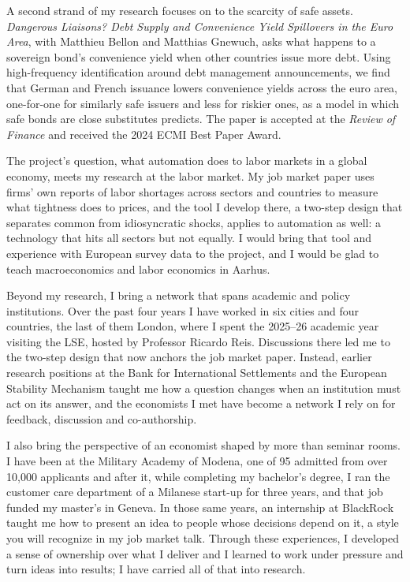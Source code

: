 \documentclass[11pt]{article}
\begin{document}
A second strand of my research focuses on to the scarcity of safe assets. \textit{Dangerous Liaisons? Debt Supply and Convenience Yield Spillovers in the Euro Area}, with Matthieu Bellon and Matthias Gnewuch, asks what happens to a sovereign bond's convenience yield when other countries issue more debt. Using high-frequency identification around debt management announcements, we find that German and French issuance lowers convenience yields across the euro area, one-for-one for similarly safe issuers and less for riskier ones, as a model in which safe bonds are close substitutes predicts. The paper is accepted at the \textit{Review of Finance} and received the 2024 ECMI Best Paper Award.

The project's question, what automation does to labor markets in a global economy, meets my research at the labor market. My job market paper uses firms' own reports of labor shortages across sectors and countries to measure what tightness does to prices, and the tool I develop there, a two-step design that separates common from idiosyncratic shocks, applies to automation as well: a technology that hits all sectors but not equally. I would bring that tool and experience with European survey data to the project, and I would be glad to teach macroeconomics and labor economics in Aarhus.

Beyond my research, I bring a network that spans academic and policy institutions. Over the past four years I have worked in six cities and four countries, the last of them London, where I spent the 2025--26 academic year visiting the LSE, hosted by Professor Ricardo Reis. Discussions there led me to the two-step design that now anchors the job market paper. Instead, earlier research positions at the Bank for International Settlements and the European Stability Mechanism taught me how a question changes when an institution must act on its answer, and the economists I met have become a network I rely on for feedback, discussion and co-authorship.

I also bring the perspective of an economist shaped by more than seminar rooms. I have been at the Military Academy of Modena, one of 95 admitted from over 10,000 applicants and after it, while completing my bachelor's degree, I ran the customer care department of a Milanese start-up for three years, and that job funded my master's in Geneva. In those same years, an internship at BlackRock taught me how to present an idea to people whose decisions depend on it, a style you will recognize in my job market talk. Through these experiences, I developed a sense of ownership over what I deliver and I learned to work under pressure and turn ideas into results; I have carried all of that into research. %
\end{document}

